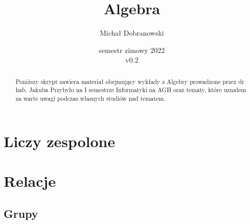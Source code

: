 \documentclass[11pt]{scrartcl}
\title{Algebra}
\author{Michał Dobranowski}
\date{semestr zimowy 2022 \\ v0.2}
\begin{document}
    \maketitle
    \begin{abstract}
        Poniższy skrypt zawiera materiał obejmujący wykłady z Algebry prowadzone przez dr hab. Jakuba Przybyło na I semestrze Informatyki na AGH oraz tematy, które uznałem za warte uwagi podczas własnych studiów nad tematem.
    \end{abstract}
    \tableofcontents
    \eject

    \section{Liczy zespolone}
    

    \section{Relacje}
    

    \subsection{Grupy}
    
\end{document}
